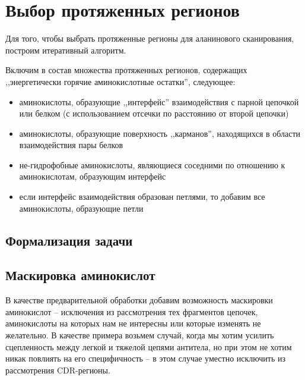 \section{Выбор протяженных регионов}
Для того, чтобы выбрать протяженные регионы для аланинового сканирования, построим итеративный алгоритм.

Включим в состав множества протяженных регионов, содержащих ,,энергетически горячие аминокислотные остатки'', следующее:
\begin{itemize}
\item аминокислоты, образующие ,,интерфейс'' взаимодействия с парной цепочкой или белком (с использованием отсечки по расстоянию от второй цепочки)
\item аминокислоты, образующие поверхность ,,карманов'', находящихся в области взаимодействия пары белков
\item не-гидрофобные аминокислоты, являющиеся соседними по отношению к аминокислотам, образующим интерфейс
\item если интерфейс взаимодействия образован петлями, то добавим все аминокислоты, образующие петли 
\end{itemize}


\subsection{Формализация задачи}

\subsection{Маскировка аминокислот}
В качестве предварительной обработки добавим возможность маскировки аминокислот -- исключения из рассмотрения тех фрагментов цепочек, аминокислоты на которых нам не интересны или которые изменять не желательно. В качестве примера возьмем случай, когда мы хотим усилить сцепленность между легкой и тяжелой цепями антитела, но при этом не хотим никак повлиять на его специфичность -- в этом случае уместно исключить из рассмотрения CDR-регионы.

